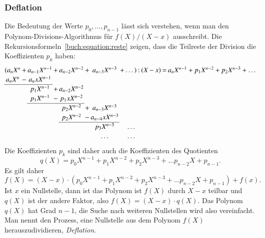 \subsubsection{Deflation}
Die Bedeutung der Werte $p_0,\dots,p_{n-1}$ lässt sich verstehen, wenn
man den Polynom-Divisions-Algorithmus für $f(X) / (X-x)$ ausschreibt.
%
Die Rekursionsformeln~\eqref{buch:equation:reste} zeigen, dass die
Teilreste der Division die Koeffizienten $p_k$ haben:
%
%
\begin{equation}
\setcounter{MaxMatrixCols}{20}
\setlength\arraycolsep{1pt}
\renewcommand\arraystretch{1.15}
\begin{matrix}
(a_nX^n&+&a_{n-1}X^{n-1}&+&a_{n-2}X^{n-2}&+&a_{n-3}X^{n-3}&+&\dots)&:&(X&-&x)&=&a_nX^{n-1}+p_1X^{n-2}+p_2X^{n-3}+\dots\\
 a_nX^n&-&a_{n}xX^{n-1} & &              & &              & &      & &  & &  & &                \\
\cline{1-3}
       & &p_1X^{n-1}    &+&a_{n-2}X^{n-2}& &              & &      & &  & &  & &                \\
       & &p_1X^{n-1}    &-&p_1xX^{n-2}   & &              & &      & &  & &  & &                \\
\cline{3-5}
       & &              & &p_2X^{n-2}    &+&a_{n-3}X^{n-3}& &      & &  & &  & &\\
       & &              & &p_2X^{n-2}    &-&a_{n-4}xX^{n-3}&&      & &  & &  &\\
\cline{5-7}
       & &              & &              & &p_3X^{n-3}     &&\dots & &  & &  &\\
       & &              & &              & &\dots          &&\dots & &  & &  &\\
\end{matrix}
\end{equation}
Die Koeffizienten $p_k$ sind daher auch die Koeffizienten des Quotienten
\[
q(X)
=
p_0X^{n-1}+p_1X^{n-2}+p_2X^{n-3}+\dots p_{n-2}X+p_{n-1}.
\]
Es gilt daher
\[
f(X)
=
(X-x) \cdot (p_0X^{n-1}+p_1X^{n-2}+p_2X^{n-3}+\dots p_{n-2}X+p_{n-1})
+
f(x).
\]
Ist $x$ ein Nullstelle, dann ist das Polynom ist $f(X)$ durch $X-x$ teilbar
und $q(X)$ ist der andere Faktor, also $f(X)=(X-x)\cdot q(X)$.
Das Polynom $q(X)$ hat Grad $n-1$, die Suche nach weiteren Nullstellen
wird also vereinfacht. 
Man nennt den Prozess, eine Nullstelle aus dem Polynom $f(X)$
herauszudividieren, {\em Deflation}.
%
%

